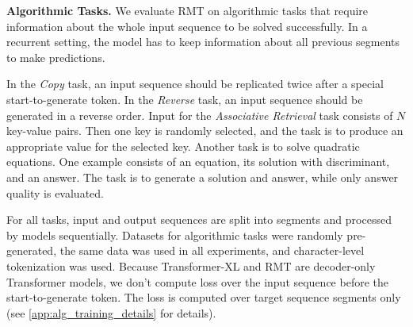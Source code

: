   \textbf{Algorithmic Tasks.} We evaluate RMT on algorithmic tasks that require information about the whole input sequence to be solved successfully. In a recurrent setting, the model has to keep information about all previous segments to make predictions.
  
  
  In the \textit{Copy} task, an input sequence should be replicated twice after a special start-to-generate token. In the \textit{Reverse} task, an input sequence should be generated in a reverse order. Input for the \textit{Associative Retrieval} task consists of $N$ key-value pairs. Then one key is randomly selected, and the task is to produce an appropriate value for the selected key. Another task is to solve quadratic equations. One example consists of an equation, its solution with discriminant, and an answer. The task is to generate a solution and answer, while only answer quality is evaluated.
  
  For all tasks, input and output sequences are split into segments and processed by models sequentially. Datasets for algorithmic tasks were randomly pre-generated, the same data was used in all experiments, and character-level tokenization was used. Because Transformer-XL and RMT are decoder-only Transformer models, we don't  compute loss over the input sequence before the start-to-generate token. The loss is computed over target sequence segments only (see \cref{app:alg_training_details} for details).
  
  
  
  
  
